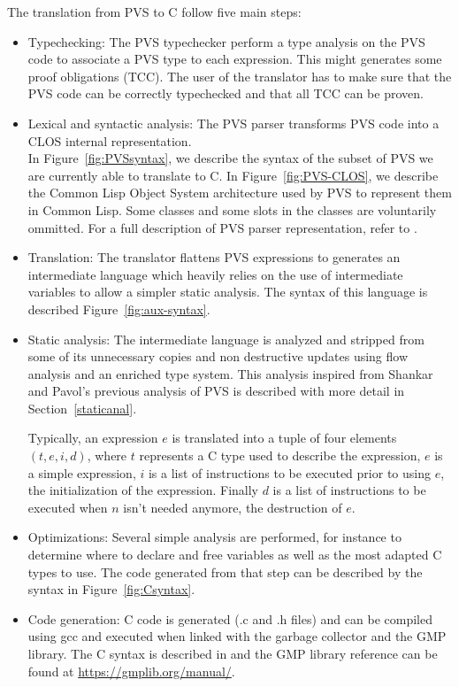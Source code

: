 \documentclass[12pt,a4paper]{article}
\begin{document}
The translation from PVS to C follow five main steps:
\begin{itemize}
\item Typechecking: The PVS typechecker perform a type analysis on the PVS code to associate a PVS type to each expression. This might generates some proof obligations (TCC). The user of the translator has to make sure that the PVS code can be correctly typechecked and that all TCC can be proven.

\item Lexical and syntactic analysis: The PVS parser transforms PVS code into a CLOS internal representation. \\

In Figure~\ref{fig:PVSsyntax}, we describe the syntax of the subset of PVS we are currently able to translate to C.
In Figure~\ref{fig:PVS-CLOS}, we describe the Common Lisp Object System architecture used by PVS to represent them in Common Lisp. Some classes and some slots in the classes are voluntarily ommitted. For a full description of PVS parser representation, refer to \cite{PVS:api}.

\item Translation: The translator flattens PVS expressions to generates an intermediate language which heavily relies on the use of intermediate variables to allow a simpler static analysis. The syntax of this language is described Figure~\ref{fig:aux-syntax}.

\item Static analysis: The intermediate language is analyzed and stripped from some of its unnecessary copies and non destructive updates using flow analysis and an enriched type system. This analysis inspired from Shankar \cite{shankar02}  \cite{incollection-minimal} and Pavol's \citep{pavol} previous analysis of PVS is described with more detail in Section~\ref{staticanal}.

Typically, an expression $e$ is translated into a tuple of four elements $(t,e,i,d)$, where $t$ represents a C type used to describe the expression, $e$ is a simple expression, $i$ is a list of instructions to be executed prior to using $e$, the initialization of the expression. Finally $d$ is a list of instructions to be executed when $n$ isn't needed anymore, the destruction of $e$.

\item Optimizations: Several simple analysis are performed, for instance to determine where to declare and free variables as well as the most adapted C types to use. The code generated from that step can be described by the syntax in Figure~\ref{fig:Csyntax}.

\item Code generation: C code is generated (.c and .h files) and can be compiled using gcc and executed when linked with the garbage collector and the GMP library. The C syntax is described in \cite{huss2004c} and the GMP library reference can be found at \href{https://gmplib.org/manual/}{https://gmplib.org/manual/}.
\end{itemize}
\end{document}
